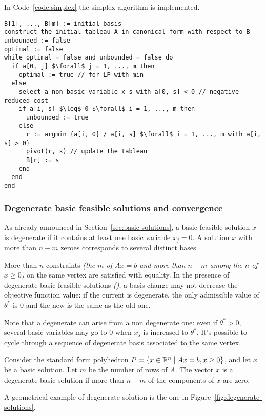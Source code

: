 \documentclass[english]{article}
\begin{document}
In Code~\ref{code:simplex} the simplex algorithm is implemented.

\begin{minipage}{0.99\textwidth}
  \begin{lstlisting}[caption={The simplex algorithm}, label={code:simplex}]
B[1], ..., B[m] := initial basis
construct the initial tableau A in canonical form with respect to B
unbounded := false
optimal := false
while optimal = false and unbounded = false do
  if a[0, j] $\forall$ j = 1, ..., m then
    optimal := true // for LP with min
  else
    select a non basic variable x_s with a[0, s] < 0 // negative reduced cost
    if a[i, s] $\leq$ 0 $\forall$ i = 1, ..., m then
      unbounded := true
    else
      r := argmin {a[i, 0] / a[i, s] $\forall$ i = 1, ..., m with a[i, s] > 0}
      pivot(r, s) // update the tableau
      B[r] := s
    end
  end
end
\end{lstlisting}
\end{minipage}

\subsubsection{Degenerate basic feasible solutions and convergence}

As already announced in Section~\ref{sec:basic-solutions}, a basic feasible solution \(x\) is degenerate if it contains at least one basic variable \(x_j = 0\).
A solution \(x\) with more than \(n -m\) zeroes corresponds to several distinct bases.

More than \(n\) constraints \textit{(the \(m\) of \(Ax = b\) and more than \(n-m\) among the \(n\) of \(x \geq 0\))} on the same vertex are satisfied with equality.
In the presence of degenerate basic feasible solutions \textit{(\BFS)}, a basis change may not decrease the objective function value:
if the current \BFS is degenerate, the only admissible value of \(\theta^\ast\) is \(0\) and the new \BFS is the same as the old one.

Note that a degenerate \BFS can arise from a non degenerate one:
even if \(\theta^\ast > 0\), several basic variables may go to \(0\) when \(x_s\) is increased to \(\theta^\ast\).
It's possible to cycle through a sequence of degenerate basis associated to the same vertex.

\begin{definition}
  Consider the standard form polyhedron \(P = \left\{ x \in \mathbb{R}^n \mid   Ax = b, x \geq 0 \right\}\), and let \(x\) be a basic solution.
  Let \(m\) be the number of rows of \(A\).
  The vector \(x\) is a degenerate basic solution if more than \(n-m\) of the components of \(x\) are zero.
\end{definition}
\bigskip
A geometrical example of degenerate solution is the one in Figure~\ref{fig:degenerate-solutions}.
\end{document}
